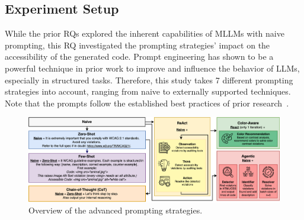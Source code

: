 \subsection{Experiment Setup}
While the prior RQs explored the inherent capabilities of MLLMs with naive
prompting, this RQ investigated the prompting strategies' impact 
on the accessibility of the generated code. Prompt engineering has shown 
to be a powerful technique in prior work to improve and influence the 
behavior of LLMs, especially in structured tasks. Therefore, this study 
takes 7 different prompting strategies into account, ranging from 
naive to externally supported techniques. Note that the prompts follow 
the established best practices of prior research~\cite{suh2025accessiblecode, xiao2024interaction2code}.\newline

\begin{figure}
  \centering
  \includegraphics[width=0.85\linewidth]{figures/prompts_new_new.png}
  \caption{Overview of the advanced prompting strategies.}
  \label{fig:prompts_new} 
\end{figure}




